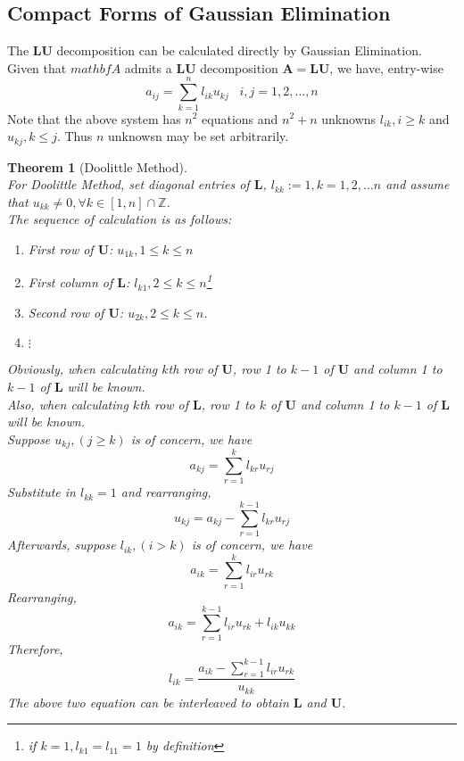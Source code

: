 \documentclass[12pt]{article}
\newtheorem{theorem}{Theorem}[section]
\theoremstyle{definition}
\begin{document}
\subsection{Compact Forms of Gaussian Elimination}
The $\mathbf{LU}$ decomposition can be calculated directly by Gaussian Elimination.\\
Given that $mathbf{A}$ admits a $\mathbf{LU}$ decomposition $\mathbf{A}=\mathbf{LU}$, we have, entry-wise
\[
a_{ij} = \sum_{k=1}^n l_{ik}u_{kj}\;\;\;i,j = 1,2,\ldots,n
\]
Note that the above system has $n^2$ equations and $n^2+n$ unknowns $l_{ik}, i\geq k$ and $u_{kj},k\leq j$. Thus $n$ unknowsn may be set arbitrarily.
\begin{theorem}[Doolittle Method]
\hfill\\\normalfont For Doolittle Method, set diagonal entries of $\mathbf{L}$, $l_{kk}:=1, k = 1,2,\ldots n$ and assume that $u_{kk}\neq 0,\forall k \in[1,n]\cap\mathbb{Z}$.\\
The sequence of calculation is as follows:
\begin{enumerate}
  \item First row of $\mathbf{U}$: $u_{1k}, 1\leq k\leq n$
  \item First column of $\mathbf{L}$: $l_{k1}, 2\leq k\leq n$\footnote{if $k = 1, l_{k1}=l_{11}=1$ by definition}
  \item Second row of $\mathbf{U}$: $u_{2k}, 2\leq k\leq n$.
  \item[] $\vdots$
\end{enumerate}
Obviously, when calculating $k$th row of $\mathbf{U}$, row 1 to $k-1$ of $\mathbf{U}$ and column 1 to $k-1$ of $\mathbf{L}$ will be known.\\
Also, when calculating $k$th row of $\mathbf{L}$, row 1 to $k$ of $\mathbf{U}$ and column 1 to $k-1$ of $\mathbf{L}$ will be known.\\
Suppose $u_{kj}, (j\geq k)$ is of concern, we have
\[
a_{kj}=\sum_{r=1}^k l_{kr}u_{rj}
\]
Substitute in $l_{kk}=1$ and rearranging,
\[
u_{kj} = a_{kj} -\sum_{r=1}^{k-1}l_{kr}u_{rj}
\]
Afterwards, suppose $l_{ik}, (i > k)$ is of concern, we have
\[
a_{ik} = \sum_{r=1}^k l_{ir}u_{rk}
\]
Rearranging,
\[
a_{ik}=\sum_{r=1}^{k-1} l_{ir}u_{rk}+l_{ik}u_{kk}
\]
Therefore,
\[
l_{ik}=\frac{a_{ik}-\sum_{r=1}^{k-1} l_{ir}u_{rk}}{u_{kk}}
\]
The above two equation can be interleaved to obtain $\mathbf{L}$ and $\mathbf{U}$.
\end{theorem}
\end{document}
